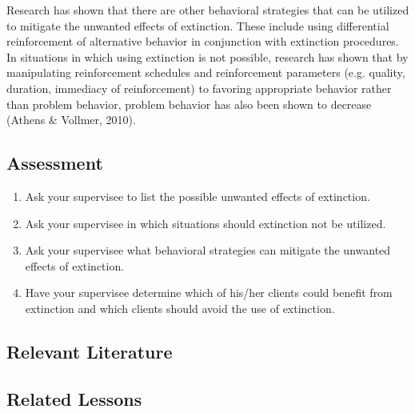 Research has shown that there are other behavioral strategies that can be utilized to mitigate the unwanted effects of extinction. These include using differential reinforcement of alternative behavior in conjunction with extinction procedures. In situations in which using extinction is not possible, research has shown that by manipulating reinforcement schedules and reinforcement parameters (e.g. quality, duration, immediacy of reinforcement) to favoring appropriate behavior rather than problem behavior, problem behavior has also been shown to decrease (Athens \& Vollmer, 2010).
%
\subsection{Assessment}
\begin{enumerate}
\item Ask your supervisee to list the possible unwanted effects of extinction.
\item Ask your supervisee in which situations should extinction not be utilized.
\item Ask your supervisee what behavioral strategies can mitigate the unwanted effects of extinction.
\item Have your supervisee determine which of his/her clients could benefit from extinction and which clients should avoid the use of extinction. 
%
\end{enumerate}
%
\subsection{Relevant Literature}
\begin{refsection}
\nocite{athens2010investigation,
    cooper2007applied,
    lerman1995prevalence,
    lerman1999side}
\printbibliography[heading=none]
\end{refsection}
%
\subsection{Related Lessons}
\fourdTwo{}\\
\fourdEighteen{}\\
\fourdNineteen{}\\
\foureOne{}\\
\foureEight{}\\
%
